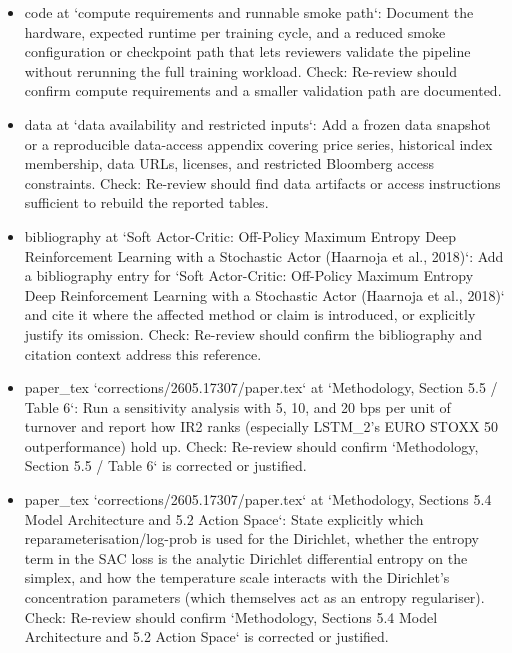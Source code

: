 \documentclass[11pt]{article}
\begin{document}
\begin{itemize}[leftmargin=*]
  \item [open] code at `compute requirements and runnable smoke path`: Document the hardware, expected runtime per training cycle, and a reduced smoke configuration or checkpoint path that lets reviewers validate the pipeline without rerunning the full training workload. Check: Re-review should confirm compute requirements and a smaller validation path are documented.
  \item [open] data at `data availability and restricted inputs`: Add a frozen data snapshot or a reproducible data-access appendix covering price series, historical index membership, data URLs, licenses, and restricted Bloomberg access constraints. Check: Re-review should find data artifacts or access instructions sufficient to rebuild the reported tables.
  \item [open] bibliography at `Soft Actor-Critic: Off-Policy Maximum Entropy Deep Reinforcement Learning with a Stochastic Actor (Haarnoja et al., 2018)`: Add a bibliography entry for `Soft Actor-Critic: Off-Policy Maximum Entropy Deep Reinforcement Learning with a Stochastic Actor (Haarnoja et al., 2018)` and cite it where the affected method or claim is introduced, or explicitly justify its omission. Check: Re-review should confirm the bibliography and citation context address this reference.
  \item [open] paper\_tex `corrections/2605.17307/paper.tex` at `Methodology, Section 5.5 / Table 6`: Run a sensitivity analysis with 5, 10, and 20 bps per unit of turnover and report how IR2 ranks (especially LSTM\_2's EURO STOXX 50 outperformance) hold up. Check: Re-review should confirm `Methodology, Section 5.5 / Table 6` is corrected or justified.
  \item [open] paper\_tex `corrections/2605.17307/paper.tex` at `Methodology, Sections 5.4 Model Architecture and 5.2 Action Space`: State explicitly which reparameterisation/log-prob is used for the Dirichlet, whether the entropy term in the SAC loss is the analytic Dirichlet differential entropy on the simplex, and how the temperature scale interacts with the Dirichlet's concentration parameters (which themselves act as an entropy regulariser). Check: Re-review should confirm `Methodology, Sections 5.4 Model Architecture and 5.2 Action Space` is corrected or justified.
\end{itemize}
\end{document}

